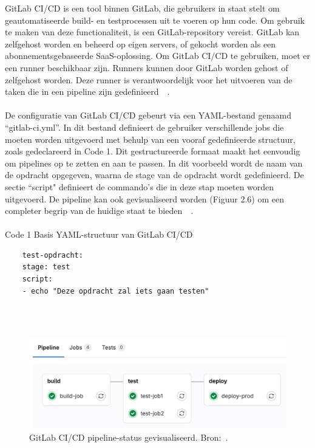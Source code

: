 GitLab CI/CD is een tool binnen GitLab,  die gebruikers in staat stelt om geautomatiseerde build- en testprocessen uit te voeren op hun code. Om gebruik te maken van deze functionaliteit, is een GitLab-repository vereist. GitLab kan zelfgehost worden en beheerd op  eigen servers, of gekocht worden als een abonnementsgebaseerde SaaS-oplossing. Om GitLab CI/CD te gebruiken, moet er een runner beschikbaar zijn. Runners kunnen door GitLab worden gehost of zelfgehost worden. Deze runner is verantwoordelijk voor het uitvoeren van de taken die in een pipeline zijn gedefinieerd~\autocite{gitlabRunner}~\autocite{gitlabCi}. 
\\\\
De configuratie van GitLab CI/CD gebeurt via een YAML-bestand genaamd “gitlab-ci.yml”. In dit bestand definieert de gebruiker verschillende jobs die moeten worden uitgevoerd met behulp van een vooraf gedefinieerde structuur, zoals gedeclareerd in Code 1. Dit gestructureerde formaat maakt het eenvoudig om pipelines op te zetten en aan te passen. In dit voorbeeld wordt de naam van de opdracht opgegeven, waarna de stage van de opdracht wordt gedefinieerd. De sectie ``script" definieert de commando's die in deze stap moeten worden uitgevoerd. De pipeline kan ook gevisualiseerd worden (Figuur 2.6) om een completer begrip van de huidige staat te bieden~\autocite{gitlabPipelines}~\autocite{gitlabRunner}.
\\\\
Code 1 Basis YAML-structuur van GitLab CI/CD
\begin{verbatim}
    test-opdracht:
    stage: test
    script:
    - echo "Deze opdracht zal iets gaan testen"
\end{verbatim}
\\\\
\begin{figure}{\textwidth}
    \centering
    \includegraphics[width=0.8\linewidth]{Foto's/pipeline_graph_v17_9.png}
    \caption{GitLab CI/CD pipeline-status gevisualiseerd. Bron:~\autocite{gitlabPipelines}.}
    \label{fig:pipeline-status}
\end{figure}

